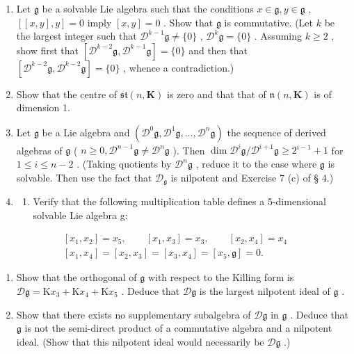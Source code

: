 \begin{enumerate}
\def\labelenumi{\arabic{enumi}.}
\setcounter{enumi}{2}
\item
  Let \(\mathfrak{g}\) be a solvable Lie algebra such that the conditions \(x\in \mathfrak{g},y\in \mathfrak{g}\) , \([[x,y],y] = 0\) imply \([x,y] = 0\) . Show that \(\mathfrak{g}\) is commutative. (Let \(k\) be the largest integer such that \(\mathcal{D}^{k - 1}\mathfrak{g}\neq \{0\}\) , \(\mathcal{D}^k\mathfrak{g} = \{0\}\) . Assuming \(k\geqslant 2\) , show first that \([\mathcal{D}^{k - 2}\mathfrak{g},\mathcal{D}^{k - 1}\mathfrak{g}] = \{0\}\) and then that \([\mathcal{D}^{k - 2}\mathfrak{g},\mathcal{D}^{k - 2}\mathfrak{g}] = \{0\}\) , whence a contradiction.)
\item
  Show that the centre of \(\mathfrak{st}(n,\mathbf{K})\) is zero and that that of \(\mathfrak{n}(n,\mathbf{K})\) is of dimension 1.
\item
  Let \(\mathfrak{g}\) be a Lie algebra and \((\mathcal{D}^0\mathfrak{g},\mathcal{D}^1\mathfrak{g},\ldots ,\mathcal{D}^n\mathfrak{g})\) the sequence of derived algebras of \(\mathfrak{g}\) ( \(n\geqslant 0,\mathcal{D}^{n - 1}\mathfrak{g}\neq \mathcal{D}^n\mathfrak{g}\) ). Then \(\dim \mathcal{D}^i\mathfrak{g} / \mathcal{D}^{i + 1}\mathfrak{g}\geqslant 2^{i - 1} + 1\) for \(1\leqslant i\leqslant n - 2\) . (Taking quotients by \(\mathcal{D}^n\mathfrak{g}\) , reduce it to the case where \(\mathfrak{g}\) is solvable. Then use the fact that \(\mathcal{D}_{\mathfrak{g}}\) is nilpotent and Exercise 7 (c) of § 4.)
\item
  \begin{enumerate}
  \def\labelenumii{(\alph{enumii})}
  \tightlist
  \item
    Verify that the following multiplication table defines a 5-dimensional solvable Lie algebra g:
  \end{enumerate}
\end{enumerate}

\[
\begin{array}{r} \left[ x _ {1}, x _ {2} \right] = x _ {5}, \qquad \left[ x _ {1}, x _ {3} \right] = x _ {3}, \qquad \left[ x _ {2}, x _ {4} \right] = x _ {4} \\ \left[ x _ {1}, x _ {4} \right] = \left[ x _ {2}, x _ {3} \right] = \left[ x _ {3}, x _ {4} \right] = \left[ x _ {5}, \mathfrak {g} \right] = 0. \end{array}
\]

\begin{enumerate}
\def\labelenumi{(\alph{enumi})}
\setcounter{enumi}{1}
\item
  Show that the orthogonal of \(\mathfrak{g}\) with respect to the Killing form is \(\mathcal{D}\mathfrak{g} = \mathrm{K}x_3 + \mathrm{K}x_4 + \mathrm{K}x_5\) . Deduce that \(\mathcal{D}\mathfrak{g}\) is the largest nilpotent ideal of \(\mathfrak{g}\) .
\item
  Show that there exists no supplementary subalgebra of \(\mathcal{D}\mathfrak{g}\) in \(\mathfrak{g}\) . Deduce that \(\mathfrak{g}\) is not the semi-direct product of a commutative algebra and a nilpotent ideal. (Show that this nilpotent ideal would necessarily be \(\mathcal{D}\mathfrak{g}\) .)
\end{enumerate}

